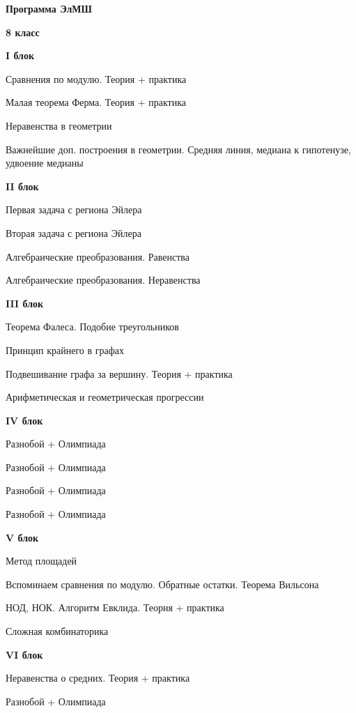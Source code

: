 \centerline{\bf \Huge Программа ЭлМШ}
\centerline{\bf \Huge 8 класс}


\textbf{\Large I блок}

Сравнения по модулю. Теория + практика

Малая теорема Ферма. Теория + практика

Неравенства в геометрии

Важнейшие доп. построения в геометрии. Средняя линия, медиана к гипотенузе, удвоение медианы

\textbf{\Large II блок}

Первая задача с региона Эйлера

Вторая задача с региона Эйлера

Алгебраические преобразования. Равенства

Алгебраические преобразования. Неравенства


\textbf{\Large III блок}

Теорема Фалеса. Подобие треугольников

Принцип крайнего в графах

Подвешивание графа за вершину. Теория + практика

Арифметическая и геометрическая прогрессии

\textbf{\Large IV блок}

Разнобой + Олимпиада

Разнобой + Олимпиада

Разнобой + Олимпиада

Разнобой + Олимпиада


\newpage

\hspace{3mm}

\textbf{\Large V блок}

Метод площадей

Вспоминаем сравнения по модулю. Обратные остатки. Теорема Вильсона

НОД, НОК. Алгоритм Евклида. Теория + практика

Сложная комбинаторика

\textbf{\Large VI блок}

Неравенства о средних. Теория + практика

Разнобой + Олимпиада


